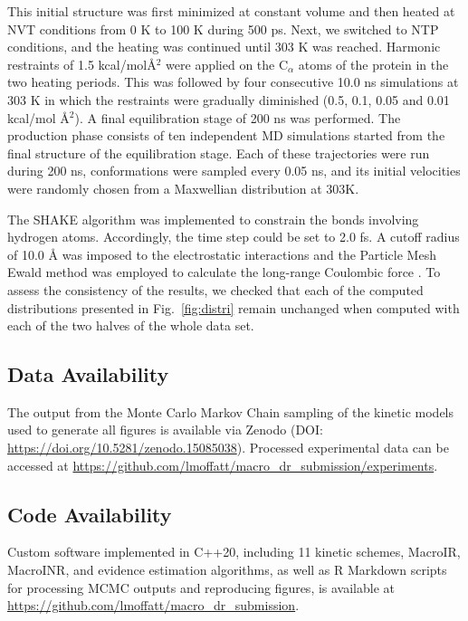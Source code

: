 \documentclass[pdflatex,sn-nature]{sn-jnl}%
\begin{document}
This initial structure was first minimized at constant volume and then heated at NVT conditions from 0 K to 100 K during 500 ps. Next, we switched to NTP conditions, and the heating was continued until 303 K was reached. Harmonic restraints of 1.5 kcal/mol{\AA}$^2$ were applied on the C$_\alpha$ atoms of the protein in the two heating periods. 
This was followed by four consecutive 10.0 ns simulations at 303 K in which the restraints were gradually diminished (0.5, 0.1, 0.05 and 0.01 kcal/mol {\AA}$^2$). A final equilibration stage of 200 ns was performed.
The production phase consists of ten independent MD simulations started from the final structure of the equilibration stage. Each of these trajectories were run during 200 ns, conformations were sampled every 0.05 ns, and its initial velocities were randomly chosen from a Maxwellian distribution at 303K.

The SHAKE algorithm was implemented to constrain the bonds involving hydrogen atoms. Accordingly, the time step could be set to 2.0 fs.
A cutoff radius of 10.0 {\AA} was imposed to the electrostatic interactions and the Particle Mesh Ewald method was employed to calculate the long-range Coulombic force \cite{ewald1,ewald2}.
To assess the consistency of the results, we checked that each of the computed distributions presented in Fig.~\ref{fig:distri} remain unchanged when computed with each of the two halves of the whole data set. 



\subsection{Data Availability}  
The output from the Monte Carlo Markov Chain sampling of the kinetic models used to generate all figures is available via Zenodo (DOI: \url{https://doi.org/10.5281/zenodo.15085038}). Processed experimental data can be accessed at \url{https://github.com/lmoffatt/macro_dr_submission/experiments}.

\subsection{Code Availability}  
Custom software implemented in C++20, including 11 kinetic schemes, MacroIR, MacroINR, and evidence estimation algorithms, as well as R Markdown scripts for processing MCMC outputs and reproducing figures, is available at \url{https://github.com/lmoffatt/macro_dr_submission}.
\end{document}
